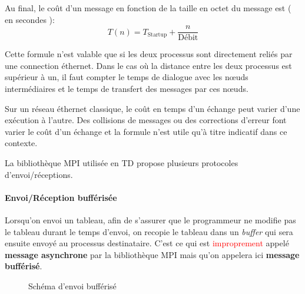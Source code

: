 \documentclass[fleqn,11pt]{article}
\begin{document}
Au final, le coût d'un message en fonction de la taille en octet du message
est ( en secondes ):
\begin{equation}
T(n) = T_{\mbox{Startup}} + \frac{n}{\mbox{Débit}}
\end{equation} 

Cette formule n'est valable que si les deux processus sont directement reliés
par une connection éthernet. Dans le cas où la distance entre les deux processus
est supérieur à un, il faut compter le temps de dialogue avec les n{\oe}uds
intermédiaires et le temps de transfert des messages par ces n{\oe}uds.

Sur un réseau éthernet classique, le coût en temps d'un échange peut varier
d'une exécution à l'autre. Des collisions de messages ou des corrections
d'erreur font varier le coût d'un échange et la formule n'est utile
qu'à titre indicatif dans ce contexte.

La bibliothèque MPI utilisée en TD propose plusieurs protocoles d'envoi/réceptions.

\paragraph{Envoi/Réception bufférisée}

Lorsqu'on envoi un tableau, afin de s'assurer que le programmeur ne modifie pas
le tableau durant le temps d'envoi, on recopie le tableau dans un \textsl{buffer}
qui sera ensuite envoyé au processus destinataire. C'est ce qui est 
\textcolor{red}{improprement} appelé \textbf{message asynchrone} par la bibliothèque MPI
mais qu'on appelera ici \textbf{message bufférisé}.

\begin{figure}[h]
\begin{center}
\end{center}
\caption{Schéma d'envoi bufférisé}
\end{figure}
\end{document}
